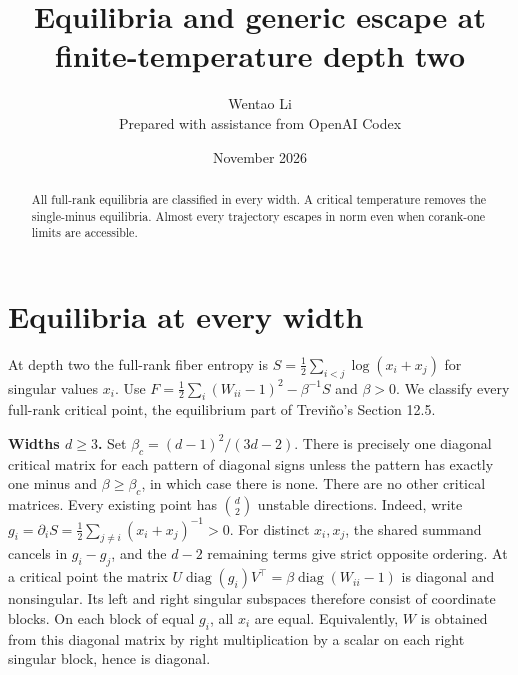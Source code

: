 \documentclass[10pt]{article}
\title{Equilibria and generic escape at finite-temperature depth two}
\author{Wentao Li\\{\small Prepared with assistance from OpenAI Codex}}
\date{November 2026}
\begin{document}
\maketitle
\begin{abstract}
All full-rank equilibria are classified in every width. A critical temperature removes the single-minus equilibria. Almost every trajectory escapes in norm even when corank-one limits are accessible.
\end{abstract}
\section*{Equilibria at every width}
At depth two the full-rank fiber entropy is $S=\frac12\sum_{i<j}\log(x_i+x_j)$ for singular values $x_i$. Use $F=\frac12\sum_i(W_{ii}-1)^2-\beta^{-1}S$ and $\beta>0$. We classify every full-rank critical point, the equilibrium part of Treviño's Section 12.5.

\textbf{Widths $d\ge3$.} Set $\beta_c=(d-1)^2/(3d-2)$. There is precisely one diagonal critical matrix for each pattern of diagonal signs unless the pattern has exactly one minus and $\beta\ge\beta_c$, in which case there is none. There are no other critical matrices. Every existing point has $\binom d2$ unstable directions.
Indeed, write $g_i=\partial_i S=\frac12\sum_{j\ne i}(x_i+x_j)^{-1}>0$. For distinct $x_i,x_j$, the shared summand cancels in $g_i-g_j$, and the $d-2$ remaining terms give strict opposite ordering. At a critical point the matrix $U\operatorname{diag}(g_i)V^\top=\beta\operatorname{diag}(W_{ii}-1)$ is diagonal and nonsingular. Its left and right singular subspaces therefore consist of coordinate blocks. On each block of equal $g_i$, all $x_i$ are equal. Equivalently, $W$ is obtained from this diagonal matrix by right multiplication by a scalar on each right singular block, hence is diagonal.
\end{document}
